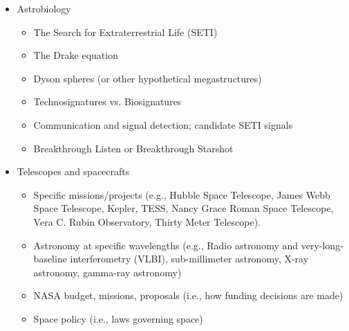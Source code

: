 \documentclass[11pt]{article}
\begin{document}
\begin{itemize}[noitemsep]
    \item Astrobiology
    \begin{itemize}[noitemsep]
        \item The Search for Extraterrestrial Life (SETI)
        \item The Drake equation
        \item Dyson spheres (or other hypothetical megastructures)
        \item Technosignatures vs. Biosignatures
        \item Communication and signal detection; candidate SETI signals
        \item Breakthrough Listen or Breakthrough Starshot
    \end{itemize}
    
    \item Telescopes and spacecrafts
        \begin{itemize}[noitemsep]
            \item Specific missions/projects (e.g., Hubble Space Telescope, James Webb Space Telescope, Kepler, TESS, Nancy Grace Roman Space Telescope, Vera C. Rubin Observatory, Thirty Meter Telescope).
            \item Astronomy at specific wavelengths (e.g., Radio astronomy and very-long-baseline interferometry (VLBI), sub-millimeter astronomy, X-ray astronomy, gamma-ray astronomy)
            \item NASA budget, missions, proposals (i.e., how funding decisions are made)
            \item Space policy (i.e., laws governing space)
        \end{itemize}


\end{itemize}
\end{document}

